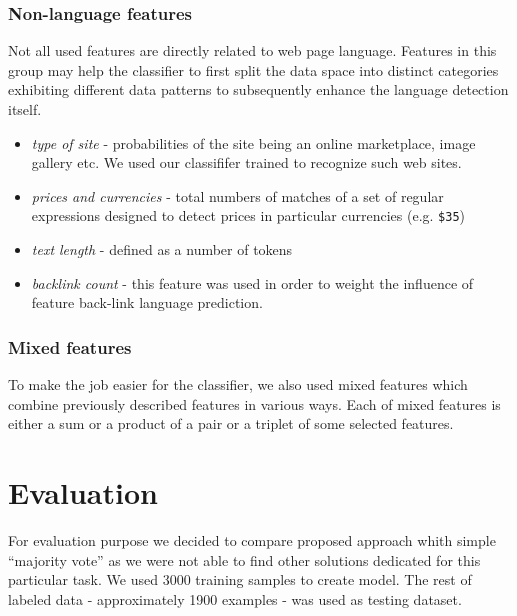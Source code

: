 \documentclass{acm_proc_article-sp}
\begin{document}
{ \subsubsection{Non-language features}
    Not all used features are directly related to web page language. Features in this group may help the
    classifier to first split the data space into distinct categories exhibiting different data patterns 
    to subsequently enhance the language detection itself.

    \begin{itemize}
      \item \textit{type of site} - probabilities of the site being an online marketplace, image gallery etc. We used
      our classififer trained to recognize such web sites.
      \item \textit{prices and currencies} - total numbers of matches of a set of regular
      expressions designed to detect prices in particular currencies (e.g. \texttt{\$35}) 
      \item \textit{text length} - defined as a number of tokens
      \item \textit{backlink count} - this feature was used in order to weight the influence of feature
      back-link language prediction.
    \end{itemize}

  \subsubsection{Mixed features}
    To make the job easier for the classifier, we also used mixed features which combine previously
    described features in various ways. Each of mixed features is either a sum or a product of a
    pair or a triplet of some selected features. 

    \section{Evaluation}
 For evaluation purpose we decided to compare proposed approach whith simple ``majority vote'' \cite{Martins:langidentweb} as we were 
 not able to find other solutions dedicated for this particular task. We used 3000 training samples to create model. 
 The rest of labeled data - approximately 1900 examples - was used as testing dataset.
 
}
\end{document}
